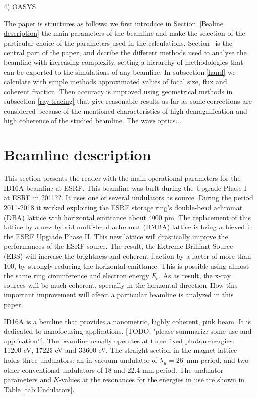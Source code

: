 \documentclass{iucr}              %
\newcommand{\todo}[1]{{\color{red}[TODO: "#1'']}}
\newcommand{\inred}[1]{{\color{red}#1}}
\begin{document}
4) OASYS

The paper is structures as follows: we first introduce in Section~\ref{Bealine description} the main parameters of the beamline and make the selection of the particular choice of the parameters used in the calculations. Section~\label{Simulations} is the central part of the paper, and decribe the different methods used to analyse the beamline with increasing complexity, setting a hierarchy of methodologies that can be exported to the simulations of any beamline. In subsection \ref{hand} we calculate with simple methods approximated values of focal size, flux and coherent fraction. Then accuracy is improved using geometrical methods in subsection \ref{ray tracing} that give reasonable results as far as some corrections are considered because of the  mentioned characteristics of high demagnification and high coherence of the studied beamline. The wave optics...


\section{Beamline description}
\label{Beamline description}

This section presents the reader with the main operational parameters for the ID16A beamline at ESRF. This beamline was built during the Upgrade Phase I at ESRF in \inred{2011??}. It uses one or several undulators as source. During the period 2011-2018 it worked exploiting the ESRF storage ring’s double-bend achromat (DBA) lattice with horizontal emittance about 4000 pm. The replacement of this lattice by a new hybrid multi-bend achromat (HMBA) lattice is being achieved in the ESRF Upgrade Phase II. This new lattice will drastically improve the performances of the ESRF source. The result, the Extreme Brilliant Source (EBS) \cite{ESRF2014} will increase the brightness and coherent fraction by a factor of more than 100, by strongly reducing the horizontal emittance. This is possible using almost the same ring circunference and electron energy $E_e$. As as result, the x-ray sources will be much coherent, specially in the horizontal direction. How this important improvement will afeect a particular beamline is analyzed in this paper. 

ID16A \cite{ID16A} is a bemline that provides a nanometric, highly coherent, pink beam. It is dedicated to nanofocusing applications. \todo{please summarize some use and application}. The beamline usually operates at three fixed photon energies: 11200 eV, 17225 eV and 33600 eV. The straight section in the magnet lattice holds three undulators: an in-vacuum undulator of $\lambda_u=26$~mm period, and two other conventional undulators of 18 and 22.4 mm period. The undulator parameters and $K$-values at the resonances for the energies in use are shown in Table \ref{tab:Undulators}. 
\end{document}
